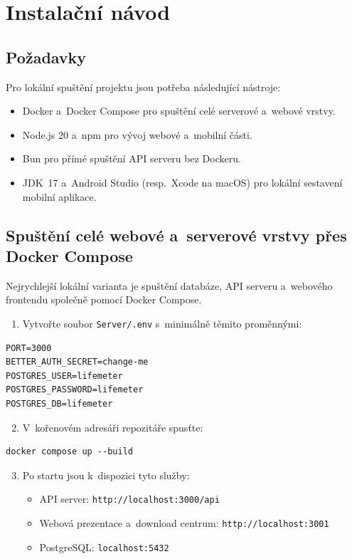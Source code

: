 \section{Instalační návod}

\subsection{Požadavky}

Pro lokální spuštění projektu jsou potřeba následující nástroje:

\begin{itemize}
  \item Docker a~Docker Compose pro spuštění celé serverové a~webové vrstvy.
  \item Node.js 20 a~npm pro vývoj webové a~mobilní části.
  \item Bun pro přímé spuštění API serveru bez Dockeru.
  \item JDK~17 a~Android Studio (resp.\ Xcode na macOS) pro lokální sestavení mobilní aplikace.
\end{itemize}

\subsection{Spuštění celé webové a~serverové vrstvy přes Docker Compose}

Nejrychlejší lokální varianta je spuštění databáze, API serveru a~webového
frontendu společně pomocí Docker Compose.

\begin{enumerate}
  \item Vytvořte soubor \texttt{Server/.env} s~minimálně těmito proměnnými:
\end{enumerate}

\begin{verbatim}
PORT=3000
BETTER_AUTH_SECRET=change-me
POSTGRES_USER=lifemeter
POSTGRES_PASSWORD=lifemeter
POSTGRES_DB=lifemeter
\end{verbatim}

\begin{enumerate}
  \setcounter{enumi}{1}
  \item V~kořenovém adresáři repozitáře spusťte:
\end{enumerate}

\begin{verbatim}
docker compose up --build
\end{verbatim}

\begin{enumerate}
  \setcounter{enumi}{2}
  \item Po startu jsou k~dispozici tyto služby:
    \begin{itemize}
      \item API server: \texttt{http://localhost:3000/api}
      \item Webová prezentace a~download centrum: \texttt{http://localhost:3001}
      \item PostgreSQL: \texttt{localhost:5432}
    \end{itemize}
\end{enumerate}

